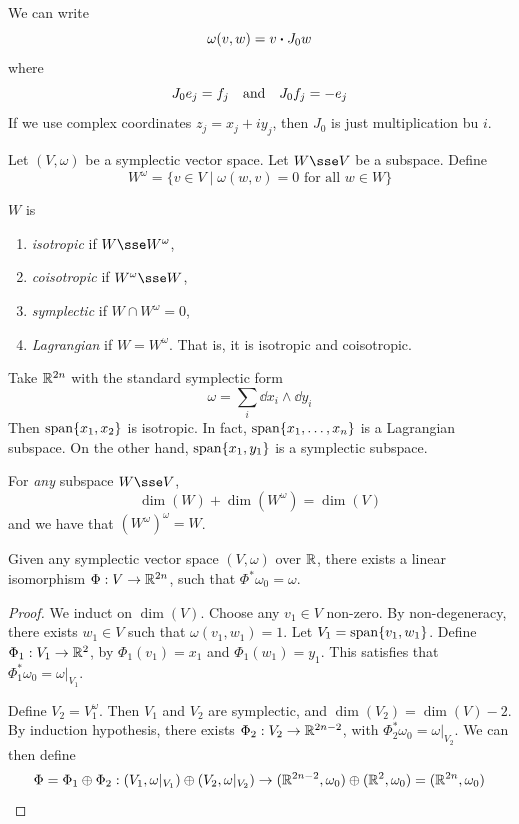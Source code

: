 \documentclass{article}
\begin{document}
We can write
\[\omega(v, w) = v \vdot J_0 w\]
where
\[J_0e_j = f_j \qqtext{and} J_0f_j = -e_j\]
If we use complex coordinates \(z_j = x_j + iy_j\), then \(J_0\) is just multiplication bu \(i\).

Let \((V, \omega)\) be a symplectic vector space. Let \(W \sse V\) be a subspace. Define
\[W^\omega = \{v \in V \mid \omega(w, v) = 0 \text{ for all }w \in W\}\]

\begin{definition}
    \(W\) is
    \begin{enumerate}
        \item \emph{isotropic} if \(W \sse W^\omega\),
        \item \emph{coisotropic} if \(W^\omega \sse W\),
        \item \emph{symplectic} if \(W \cap W^\omega = 0\),
        \item \emph{Lagrangian} if \(W = W^\omega\). That is, it is isotropic and coisotropic.
    \end{enumerate}
\end{definition}

\begin{example}
    Take \(\mathbb{R}^{2n}\) with the standard symplectic form
    \[\omega = \sum_i \dd x_i \wedge \dd y_i\]
    Then \(\operatorname{span}\{x_1, x_2\}\) is isotropic. In fact, \(\operatorname{span}\{x_1, \dots, x_n\}\) is a Lagrangian subspace. On the other hand, \(\operatorname{span}\{x_1, y_1\}\) is a symplectic subspace.
\end{example}

\begin{remark}
    For \emph{any} subspace \(W \sse V\),
    \[\dim(W) + \dim(W^\omega) = \dim(V)\]
    and we have that \((W^\omega)^\omega = W\).
\end{remark}

\begin{theorem}
    Given any symplectic vector space \((V, \omega)\) over \(\mathbb{R}\), there exists a linear isomorphism \(\Phi : V \to \mathbb{R}^{2n}\), such that \(\Phi^*\omega_0 = \omega\).
\end{theorem}

\begin{proof}
    We induct on \(\dim(V)\). Choose any \(v_1 \in V\) non-zero. By non-degeneracy, there exists \(w_1 \in V\) such that \(\omega(v_1, w_1) = 1\). Let \(V_1 = \operatorname{span}\{v_1, w_1\}\). Define \(\Phi_1 : V_1 \to \mathbb{R}^2\), by \(\Phi_1(v_1) = x_1\) and \(\Phi_1(w_1) = y_1\). This satisfies that \(\Phi_1^*\omega_0 = \omega\vert_{V_1}\).

    Define \(V_2 = V_1^\omega\). Then \(V_1\) and \(V_2\) are symplectic, and \(\dim(V_2) = \dim(V) - 2\). By induction hypothesis, there exists \(\Phi_2 : V_2 \to \mathbb{R}^{2n-2}\), with \(\Phi_2^*\omega_0 = \omega\vert_{V_2}\). We can then define
    \[\Phi = \Phi_1 \oplus \Phi_2 : (V_1, \omega\vert_{V_1}) \oplus (V_2, \omega\vert_{V_2}) \to (\mathbb{R}^{2n-2}, \omega_0) \oplus (\mathbb{R}^2, \omega_0) = (\mathbb{R}^{2n}, \omega_0)\]
\end{proof}
\end{document}
